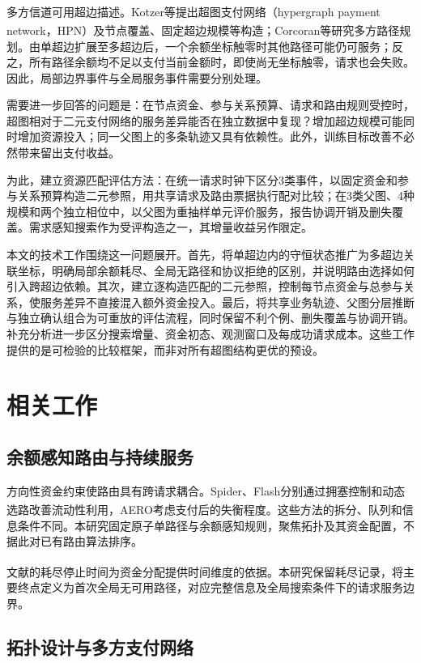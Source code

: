 \documentclass[UTF8,a4paper,twocolumn,fontset=none,zihao=5]{ctexart}
\newcommand{\upcite}[1]{\textsuperscript{\cite{#1}}}
\begin{document}
多方信道可用超边描述。Kotzer等\upcite{r10}提出超图支付网络（hypergraph payment network，HPN）及节点覆盖、固定超边规模等构造；Corcoran等\upcite{r11}研究多方路径规划。由单超边扩展至多超边后，一个余额坐标触零时其他路径可能仍可服务；反之，所有路径余额均不足以支付当前金额时，即使尚无坐标触零，请求也会失败。因此，局部边界事件与全局服务事件需要分别处理。


需要进一步回答的问题是：在节点资金、参与关系预算、请求和路由规则受控时，超图相对于二元支付网络的服务差异能否在独立数据中复现？增加超边规模可能同时增加资源投入；同一父图上的多条轨迹又具有依赖性。此外，训练目标改善不必然带来留出支付收益。


为此，建立资源匹配评估方法：在统一请求时钟下区分3类事件，以固定资金和参与关系预算构造二元参照，用共享请求及路由票据执行配对比较；在3类父图、4种规模和两个独立相位中，以父图为重抽样单元评价服务，报告协调开销及删失覆盖。需求感知搜索作为受评构造之一，其增量收益另作限定。


本文的技术工作围绕这一问题展开。首先，将单超边内的守恒状态推广为多超边关联坐标，明确局部余额耗尽、全局无路径和协议拒绝的区别，并说明路由选择如何引入跨超边依赖。其次，建立逐构造匹配的二元参照，控制每节点资金与总参与关系，使服务差异不直接混入额外资金投入。最后，将共享业务轨迹、父图分层推断与独立确认组合为可重放的评估流程，同时保留不利个例、删失覆盖与协调开销。补充分析进一步区分搜索增量、资金初态、观测窗口及每成功请求成本。这些工作提供的是可检验的比较框架，而非对所有超图结构更优的预设。


\section{相关工作}

\subsection{余额感知路由与持续服务}

方向性资金约束使路由具有跨请求耦合。Spider、Flash分别通过拥塞控制和动态选路改善流动性利用\upcite{r3,r4}，AERO考虑支付后的失衡程度\upcite{r12}。这些方法的拆分、队列和信息条件不同。本研究固定原子单路径与余额感知规则，聚焦拓扑及其资金配置，不据此对已有路由算法排序。


文献\upcite{r9}的耗尽停止时间为资金分配提供时间维度的依据。本研究保留耗尽记录，将主要终点定义为首次全局无可用路径，对应完整信息及全局搜索条件下的请求服务边界。


\subsection{拓扑设计与多方支付网络}
\end{document}
